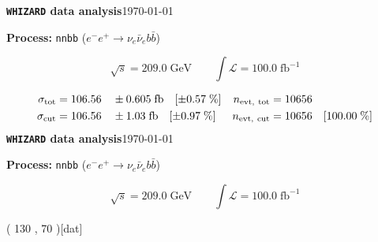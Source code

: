 \documentclass[12pt]{article}
\begin{document}
\begin{gmlfile}
 
\noindent\textbf{\large\texttt{WHIZARD} data analysis}\hfill\today
\begin{flushleft}
\textbf{Process:} 
  \verb|nnbb| ($ e^- e^+ \to \nu_e \bar\nu_e b \bar b$) \\
\end{flushleft}
%
\begin{displaymath}
  \sqrt{s} =   209.0    \;\textrm{GeV}\qquad
  \int\mathcal{L} =   100.0    \;\textrm{fb}^{-1}
\end{displaymath}
\begin{center} \unitlength 1mm
\end{center}
%
\begin{align*}
  \sigma_{\rm tot} &=   106.56     \quad \pm  0.605    \;\textrm{fb}
   \quad [\pm    0.57\;\%]
 & n_{\rm evt,\ tot} &=        10656
 \\
  \sigma_{\rm cut} &=   106.56     \quad \pm   1.03    \;\textrm{fb}
   \quad [\pm    0.97\;\%]
 & n_{\rm evt,\ cut} &=        10656  \quad 
  [  100.00 \;\%]
\end{align*}
%
%
\newpage
\noindent\textbf{\large\texttt{WHIZARD} data analysis}\hfill\today
\begin{flushleft}
\textbf{Process:} 
  \verb|nnbb| ($ e^- e^+ \to \nu_e \bar\nu_e b \bar b$) \\
\end{flushleft}
%
\begin{displaymath}
  \sqrt{s} =   209.0    \;\textrm{GeV}\qquad
  \int\mathcal{L} =   100.0    \;\textrm{fb}^{-1}
\end{displaymath}
\begin{center} \unitlength 1mm
\begin{gmlgraph*}(         130 ,           70 )[dat]

\end{gmlgraph*}
\end{center}
\end{gmlfile}
\end{document}
